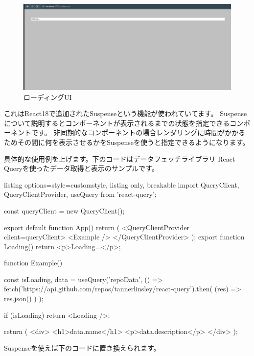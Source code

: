 \begin{figure}[H]
  \centering
  \includegraphics[width=12cm]{./image/03-Tech/chap4/07.png}
  \caption{ローディングUI}
\end{figure}




これはReact18で追加されたSuspenseという機能が使われていてます。
Suspenseについて説明するとコンポーネントが表示されるまでの状態を指定できるコンポーネントです。
非同期的なコンポーネントの場合レンダリングに時間がかかるためその間に何を表示させるかをSuspenseを使うと指定できるようになります。

具体的な使用例を上げます。下のコードはデータフェッチライブラリ React Queryを使ったデータ取得と表示のサンプルです。






\begin{tcblisting}{listing options={style=customstyle}, listing only, breakable}
  import { QueryClient, QueryClientProvider, useQuery } from 'react-query';

  const queryClient = new QueryClient();

  export default function App() {
    return (
    <QueryClientProvider client={queryClient}>
    <Example />
    </QueryClientProvider>
    );
  }
  export function Loading() {
      return <p>Loading...</p>;
  }

  function Example() {
    const { isLoading, data } = useQuery('repoData', () =>
    fetch('https://api.github.com/repos/tannerlinsley/react-query').then(
    (res) => res.json()
    )
    );

    if (isLoading) return <Loading />;

    return (
      <div>
        <h1>{data.name}</h1>
        <p>{data.description}</p>
      </div>
    );
  }
\end{tcblisting}




Suspenseを使えば下のコードに置き換えられます。



